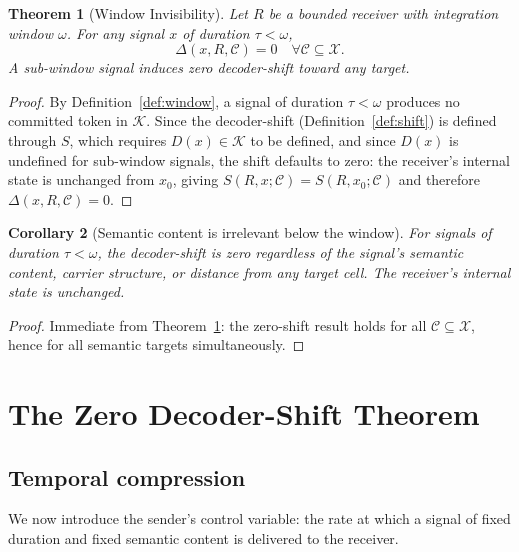 \documentclass[twocolumn,11pt,a4paper]{article}
\theoremstyle{main}
\newtheorem{theorem}{Theorem}[section]
\newtheorem{corollary}[theorem]{Corollary}
\theoremstyle{definition}
\theoremstyle{remark}
\newcommand{\Out}{\mathcal{X}}
\newcommand{\Know}{\mathcal{K}}
\newcommand{\Cell}{\mathcal{C}}
\newcommand{\Dec}{D}
\newcommand{\Recv}{R}
\newcommand{\Sval}{S}
\newcommand{\shift}{\Delta}
\newcommand{\window}{\omega}
\begin{document}
\begin{theorem}[Window Invisibility]
\label{thm:invisible}
Let $\Recv$ be a bounded receiver with integration window $\window$. For
any signal $x$ of duration $\tau < \window$,
\[
  \shift(x, \Recv, \Cell) = 0 \quad \forall \Cell \subseteq \Out.
\]
A sub-window signal induces zero decoder-shift toward any target.
\end{theorem}

\begin{proof}
By Definition~\ref{def:window}, a signal of duration $\tau < \window$
produces no committed token in $\Know$. Since the decoder-shift
(Definition~\ref{def:shift}) is defined through $\Sval$, which requires
$\Dec(x) \in \Know$ to be defined, and since $\Dec(x)$ is undefined for
sub-window signals, the shift defaults to zero: the receiver's internal
state is unchanged from $x_0$, giving
$\Sval(\Recv, x; \Cell) = \Sval(\Recv, x_0; \Cell)$ and therefore
$\shift(x, \Recv, \Cell) = 0$.
\end{proof}

\begin{corollary}[Semantic content is irrelevant below the window]
\label{cor:irrelevant}
For signals of duration $\tau < \window$, the decoder-shift is zero
regardless of the signal's semantic content, carrier structure, or
distance from any target cell. The receiver's internal state is
unchanged.
\end{corollary}

\begin{proof}
Immediate from Theorem~\ref{thm:invisible}: the zero-shift result holds
for all $\Cell \subseteq \Out$, hence for all semantic targets
simultaneously.
\end{proof}

\section{The Zero Decoder-Shift Theorem}
\label{sec:zero}

\subsection{Temporal compression}

We now introduce the sender's control variable: the rate at which a
signal of fixed duration and fixed semantic content is delivered to the
receiver.
\end{document}
